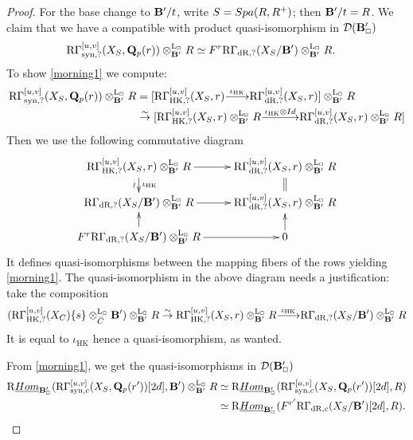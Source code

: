 \documentclass[10pt,reqno]{amsart}
\theoremstyle{definition}
\theoremstyle{remark}
\def\lomapr#1{\smash{\mathop{\relbar\joinrel\longrightarrow}\limits^{#1}}}
\def\verylomapr#1{\smash{\mathop{\relbar\joinrel\relbar\joinrel\relbar\joinrel\longrightarrow}\limits^{#1}}}
\newcommand{\dr}{\operatorname{dR} }
\newcommand{\uHom}{\underline{{\rm{Hom}} }}
\newcommand{\synt}{ \operatorname{syn} }
\newcommand{\hk}{\operatorname{HK} }
\newcommand{\LL}{\operatorname{L} }
\newcommand{\sd}{{\mathcal{D}}}
\numberwithin{equation}{section}
\def\R{{\mathrm R}}
\def\Q{{\bf Q}} \def\Z{{\bf Z}}
\numberwithin{equation}{section}
\begin{document}
\begin{proof}
 

For the base change to ${\bf B}^{\prime}/t$, write $S={\rm Spa}(R,R^+)$; then ${\bf B}^{\prime}/t=R$. We
claim that we have a compatible with product quasi-isomorphism in $\sd(\B^{\prime}_{\Box})$
\begin{align}\label{morning1}
 \R\Gamma^{{[u,v]}}_{\synt,?}(X_S,  \Q_p(r))\otimes^{\LL_{\Box}}_{\B^{\prime}} R & 
 \simeq F^r\R\Gamma_{\dr,?}(X_S/\B^{\prime})\otimes^{\LL_{\Box}}_{\B^{\prime}} R.
 \end{align}
 To show 
 \eqref{morning1} we compute:
\begin{align*}
 \R\Gamma^{{[u,v]}}_{\synt,?}(X_S,  \Q_p(r))\otimes^{\LL_{\Box}}_{\B^{\prime}} R & 
 =[\R\Gamma^{{[u,v]}}_{\hk,?}(X_S,r)\lomapr{\iota_{\hk}}\R\Gamma^{{[u,v]}}_{\dr,?}(X_S,r)]\otimes^{\LL_{\Box}}_{\B^{\prime}} R\\
  &  \stackrel{\sim}{\to}[\R\Gamma^{{[u,v]}}_{\hk,?}(X_S,r)\otimes^{\LL_{\Box}}_{\B^{\prime}} R\verylomapr{\iota_{\hk}\otimes{\rm Id}}\R\Gamma^{{[u,v]}}_{\dr,?}(X_S,r)\otimes^{\LL_{\Box}}_{\B^{\prime}} R]
\end{align*}
Then we use the following commutative diagram
$$
\xymatrix@R=4mm{
\R\Gamma^{{[u,v]}}_{\hk,?}(X_S,r)\otimes^{\LL_{\Box}}_{\B^{\prime}} R\ar[r]\ar[d]^{\iota_{\hk}}_{\wr} & \R\Gamma^{{[u,v]}}_{\dr,?}(X_S,r)\otimes^{\LL_{\Box}}_{\B^{\prime}} R\ar@{=}[d]\\
 \R\Gamma_{\dr,?}(X_S/\B^{\prime})\otimes^{\LL_{\Box}}_{\B^{\prime}} R\ar[r] & \R\Gamma^{{[u,v]}}_{\dr,?}(X_S,r)\otimes^{\LL_{\Box}}_{\B^{\prime}} R\\
 F^r\R\Gamma_{\dr,?}(X_S/\B^{\prime})\otimes^{\LL_{\Box}}_{\B^{\prime}} R\ar[r] \ar[u]& 0\ar[u]
 }
$$
It defines quasi-isomorphisms between the mapping fibers of the rows yielding \eqref{morning1}. The quasi-isomorphism in the above diagram needs a justification: take the composition
$$
(\R\Gamma^{{[u,v]}}_{\hk,?}(X_C)\{s\}\otimes^{\LL_{\Box}}_{\breve{C}}\B^{\prime})\otimes^{\LL_{\Box}}_{\B^{\prime}}R \stackrel{\sim}{\to}\R\Gamma^{{[u,v]}}_{\hk,?}(X_S,r)\otimes^{\LL_{\Box}}_{\B^{\prime}} R  \lomapr{\iota_{\hk}}\R\Gamma_{\dr,?}(X_S/\B^{\prime})\otimes^{\LL_{\Box}}_{\B^{\prime}} R
$$
It is equal to $\iota_{\hk}$ hence a quasi-isomorphism, as wanted. 

  From \eqref{morning1}, we get the quasi-isomorphisms in $\sd(\B^{\prime}_{\Box})$
 \begin{align*}
  \R\uHom_{\B^{\prime}_{\Box}}(\R\Gamma^{{[u,v]}}_{\synt,c}(X_S,\Q_p(r^{\prime}))[2d],\B^{\prime})\otimes^{\LL_{\Box}}_{\B^{\prime}}R 
 & \simeq  \R\uHom_{\B^{\prime}_{\Box}}(\R\Gamma^{{[u,v]}}_{\synt,c}(X_S,\Q_p(r^{\prime}))[2d],R)\\
 &  \simeq  \R\uHom_{\B^{\prime}_{\Box} }( F^{r^{\prime}}\R\Gamma_{\dr,c}(X_S/\B^{\prime})[2d],R).
\end{align*}


\end{proof}
\end{document}
